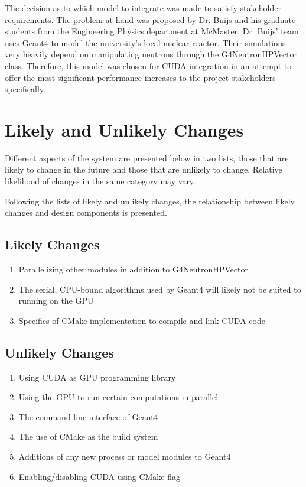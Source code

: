 \documentclass[12pt]{article}
\begin{document}
The decision as to which model to integrate was made to satisfy stakeholder requirements. The problem at hand was proposed by Dr. Buijs and his graduate students from the Engineering Physics department at McMaster. Dr. Buijs' team uses Geant4 to model the university's local nuclear reactor. Their simulations very heavily depend on manipulating neutrons through the G4NeutronHPVector class. Therefore, this model was chosen for CUDA integration in an attempt to offer the most significant performance increases to the project stakeholders specifically.

\section{Likely and Unlikely Changes}
Different aspects of the system are presented below in two lists, those that are likely to change in the future and those that are unlikely to change. Relative likelihood of changes in the same category may vary.

Following the lists of likely and unlikely changes, the relationship between likely changes and design components is presented.

\subsection{Likely Changes}\label{Sec_LikelyChanges} %
\begin{enumerate}
\item Parallelizing other modules in addition to G4NeutronHPVector
\item The serial, CPU-bound algorithms used by Geant4 will likely not be suited to running on the GPU
\item Specifics of CMake implementation to compile and link CUDA code
\end{enumerate}

\subsection{Unlikely Changes} %
\begin{enumerate}
\item Using CUDA as GPU programming library
\item Using the GPU to run certain computations in parallel
\item The command-line interface of Geant4
\item The use of CMake as the build system
\item Additions of any new process or model modules to Geant4
\item Enabling/disabling CUDA using CMake flag
\end{enumerate}
\end{document}
